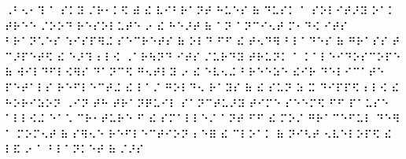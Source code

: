 \documentclass{scrartcl}
\begin{document}
\setmainfont{LouisLouis.ttf}



⠠⠃⠢⠂⠹ ⠁ ⠎⠅⠽ ⠌⠗⠂⠅⠫ ⠾ ⠮ ⠧⠊⠃⠗⠁⠝⠞ ⠓⠥⠑⠎ ⠷ ⠙⠥⠎⠅ ⠁ ⠎⠕⠇⠊⠞⠜⠽ ⠕⠁⠅ ⠞⠗⠑⠑ ⠌⠕⠕⠙ ⠗⠑⠎⠕⠇⠥⠞⠑ ⠔ ⠮ ⠓⠑⠜⠞ ⠷ ⠁⠝ ⠁⠝⠉⠊⠢⠞ ⠍⠂⠙⠪ ⠊⠞⠎ ⠃⠗⠁⠝⠡⠑⠎ ⠱⠊⠎⠏⠻⠬ ⠎⠑⠉⠗⠑⠞⠎ ⠷ ⠕⠇⠙ ⠋⠋ ⠮ ⠞⠢⠙⠻ ⠃⠇⠁⠙⠑⠎ ⠷ ⠛⠗⠁⠎⠎ ⠞ ⠉⠜⠏⠑⠞⠫ ⠮ ⠑⠜⠹ ⠆⠇⠪ ⠠⠁⠗⠳⠝⠙ ⠊⠞⠎ ⠌⠥⠗⠙⠽ ⠞⠗⠥⠝⠅ ⠁ ⠅⠁⠇⠑⠊⠙⠕⠎⠉⠕⠏⠑ ⠷ ⠺⠊⠇⠙⠋⠇⠪⠻⠎ ⠙⠁⠝⠉⠫ ⠛⠢⠞⠇⠽ ⠔ ⠮ ⠑⠧⠢⠬ ⠃⠗⠑⠑⠵⠑ ⠮⠊⠗ ⠙⠑⠇⠊⠉⠁⠞⠑ ⠏⠑⠞⠁⠇⠎ ⠗⠑⠋⠇⠑⠉⠞⠬ ⠮ ⠇⠁⠌ ⠛⠕⠇⠙⠢ ⠗⠁⠽⠎ ⠷ ⠮ ⠎⠥⠝ ⠵ ⠭ ⠙⠊⠏⠏⠫ ⠆⠇⠪ ⠮ ⠓⠕⠗⠊⠵⠕⠝ ⠠⠊⠝ ⠞⠓ ⠞⠗⠁⠝⠟⠥⠊⠇ ⠎⠁⠝⠉⠞⠥⠜⠽ ⠞⠊⠍⠑ ⠎⠑⠑⠍⠫ ⠋⠋ ⠏⠁⠥⠎⠑ ⠁⠇⠇⠪⠬ ⠑⠁⠡ ⠉⠗⠂⠞⠥⠗⠑ ⠋ ⠮ ⠎⠍⠁⠇⠇⠑⠌ ⠁⠝⠞ ⠋⠋ ⠮ ⠍⠕⠌ ⠛⠗⠁⠉⠑⠋⠥⠇ ⠙⠑⠻ ⠁ ⠍⠕⠍⠢⠞ ⠷ ⠎⠻⠢⠑ ⠗⠑⠋⠇⠑⠉⠞⠊⠕⠝ ⠆⠑⠿ ⠮ ⠉⠇⠕⠁⠅ ⠷ ⠝⠊⠣⠞ ⠢⠧⠑⠇⠕⠏⠫ ⠮ ⠇⠯ ⠔ ⠁ ⠃⠇⠁⠝⠅⠑⠞ ⠷ ⠌⠜⠎ 
\end{document}
